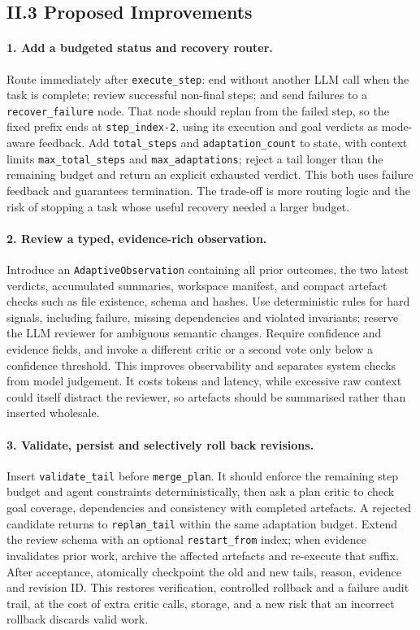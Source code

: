 \subsection{II.3 Proposed Improvements}

\paragraph{1. Add a budgeted status and recovery router.}
Route immediately after \texttt{execute\_step}: end without another LLM call when
the task is complete; review successful non-final steps; and send failures to a
\texttt{recover\_failure} node. That node should replan from the failed step, so
the fixed prefix ends at \texttt{step\_index-2}, using its execution and goal
verdicts as mode-aware feedback. Add \texttt{total\_steps} and
\texttt{adaptation\_count} to state, with context limits
\texttt{max\_total\_steps} and \texttt{max\_adaptations}; reject a tail longer
than the remaining budget and return an explicit exhausted verdict. This both
uses failure feedback and guarantees termination. The trade-off is more routing
logic and the risk of stopping a task whose useful recovery needed a larger
budget.

\paragraph{2. Review a typed, evidence-rich observation.}
Introduce an \texttt{AdaptiveObservation} containing all prior outcomes, the two
latest verdicts, accumulated summaries, workspace manifest, and compact artefact
checks such as file existence, schema and hashes. Use deterministic rules for
hard signals, including failure, missing dependencies and violated invariants;
reserve the LLM reviewer for ambiguous semantic changes. Require confidence and
evidence fields, and invoke a different critic or a second vote only below a
confidence threshold. This improves observability and separates system checks
from model judgement. It costs tokens and latency, while excessive raw context
could itself distract the reviewer, so artefacts should be summarised rather
than inserted wholesale.

\paragraph{3. Validate, persist and selectively roll back revisions.}
Insert \texttt{validate\_tail} before \texttt{merge\_plan}. It should enforce the
remaining step budget and agent constraints deterministically, then ask a plan
critic to check goal coverage, dependencies and consistency with completed
artefacts. A rejected candidate returns to \texttt{replan\_tail} within the same
adaptation budget. Extend the review schema with an optional
\texttt{restart\_from} index; when evidence invalidates prior work, archive the
affected artefacts and re-execute that suffix. After acceptance, atomically
checkpoint the old and new tails, reason, evidence and revision ID. This restores
verification, controlled rollback and a failure audit trail, at the cost of extra
critic calls, storage, and a new risk that an incorrect rollback discards valid
work.
